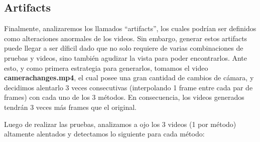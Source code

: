 \subsection{Artifacts}

Finalmente, analizaremos los llamados ``artifacts'', los cuales podr\'ian ser definidos como alteraciones anormales de los videos. Sin embargo, generar estos artifacts puede llegar a ser d\'ificil dado que no solo requiere de varias combinaciones de pruebas y videos, sino tambi\'en agudizar la vista para poder encontrarlos. Ante esto, y como primera estrategia para generarlos, tomamos el video \textbf{camerachanges.mp4}, el cual posee una gran cantidad de cambios de c\'amara, y decidimos alentarlo 3 veces consecutivas (interpolando 1 frame entre cada par de frames) con cada uno de los 3 m\'etodos. En consecuencia, los videos generados tendr\'an 3 veces m\'as frames que el original.

Luego de realizar las pruebas, analizamos a ojo los 3 videos (1 por m\'etodo) altamente alentados y detectamos lo siguiente para cada m\'etodo:


